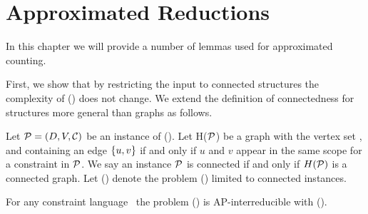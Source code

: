 \chapter{Approximated Reductions}
In this chapter we will provide a number of lemmas used for approximated counting. 

First, we show that by restricting the input to connected structures the complexity of 
\ccsp(\mrelset) does not change. We extend the definition of connectedness for structures more general 
than graphs as follows.

Let \(\mathcal{P} = (D, V, \mathcal{C})\) be an instance of \ccsp(\mrelset)\@. Let H(\(\mathcal{P}\)) be a graph
with the vertex set \mV, and containing an edge \(\{{u,v}\}\) if and only if 
\(u\) and \(v\) appear in the same scope for a constraint in \(\mathcal{P}\)\@.
We say an instance \(\mathcal{P}\) is connected if and only if \(H(\mathcal{P})\) is a connected graph.
Let \cccsp(\mrelset) denote the problem \ccsp(\mrelset) limited to connected instances.

\begin{lemma} \label{lem:connected}
For any constraint language \mrelset\ the problem \ccsp(\mrelset) is AP-interreducible with
\cccsp(\mrelset)\@.
\end{lemma}


